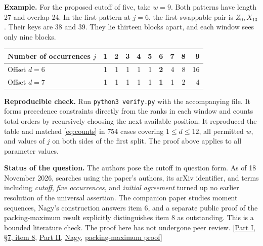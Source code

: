 \documentclass[11pt]{article}
\newcommand{\sourcepaper}{\href{https://arxiv.org/html/2610.29846v1\#S7}{Part I, \S7, item 8}}
\begin{document}
\textbf{Example.} For the proposed cutoff of five, take $w=9$. Both patterns have length 27 and overlap 24. In the first pattern at $j=6$, the first swappable pair is $Z_0,X_{13}$. Their keys are 38 and 39. They lie thirteen blocks apart, and each window sees only nine blocks.
\begin{center}\small
\begin{tabular}{lrrrrrrrrr}
\toprule
Number of occurrences $j$ & 1&2&3&4&5&6&7&8&9\\
\midrule
Offset $d=6$ &1&1&1&1&1&\textbf{2}&4&8&16\\
Offset $d=7$ &1&1&1&1&1&\textbf{1}&1&2&4\\
\bottomrule
\end{tabular}
\end{center}

\textbf{Reproducible check.}
Run \texttt{python3 verify.py} with the accompanying file. It forms precedence constraints directly from the ranks in each window and counts total orders by recursively choosing the next available position. It reproduced the table and matched \eqref{eq:counts} in 754 cases covering $1\le d\le12$, all permitted $w$, and values of $j$ on both sides of the first split. The proof above applies to all parameter values.

\textbf{Status of the question.}
The authors pose the cutoff in question form. As of 18 November 2026, searches using the paper's authors, its arXiv identifier, and terms including \emph{cutoff}, \emph{five occurrences}, and \emph{initial agreement} turned up no earlier resolution of the universal assertion. The companion paper studies moment sequences, Nagy's construction answers item 6, and a separate public proof of the packing-maximum result explicitly distinguishes item 8 as outstanding. This is a bounded literature check. The proof here has not undergone peer review. [\sourcepaper, \href{https://arxiv.org/abs/2611.12829}{Part II}, \href{https://arxiv.org/abs/2611.06937}{Nagy}, \href{https://the-omega-institute.github.io/trureturing-mdbook/Blueprint/D5/S3/Combinatorics/Permutation/PackingMaximumRefutation.html}{packing-maximum proof}]
\end{document}
